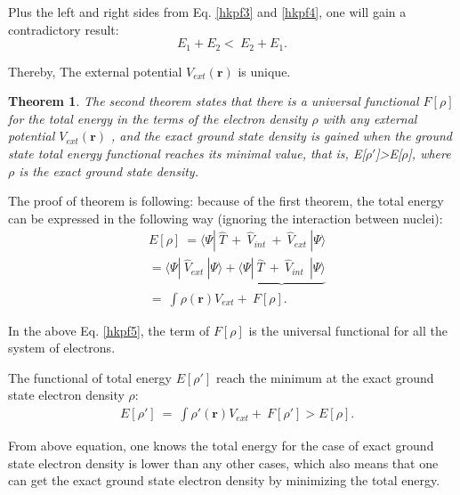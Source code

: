 \documentclass[a4paper, 12pt, titlepage,oneside,drop]{kthesis}
\newtheorem{thm}{Theorem}
\begin{document}
Plus the left and right sides from Eq. \ref{hkpf3} and \ref{hkpf4}, one will gain a contradictory result:
\begin{equation}\label{hkpf4}
  E_1 + E_2  < \  E_2 + E_1.
\end{equation}

Thereby, The external potential $V_\textit{ext}(\textbf{r})$ is unique.

\begin{thm}
\label{hk2}
\noindent The second theorem states that there is a universal functional $F[\rho]$ for the total energy in the terms of the electron density $\rho$ with any external potential $V_\textit{ext}(\textbf{r})$ ,
and the exact ground state density is gained when the ground state total energy functional reaches its minimal value, that is, E[$\rho'$]>E[$\rho$], where $\rho$ is the exact ground state density.
\end{thm}

The proof of theorem is following:
because of the first theorem, the total energy can be expressed in the following way (ignoring the interaction between nuclei):
\begin{equation}\label{hkpf5}\begin{split}
& E[\rho] \ =\langle \Psi  | \ \hat{T} \ + \ \hat{V}_\textit{int}  \ + \ \hat{V}_\textit{ext} \ | \Psi \rangle \\
&     = \langle \Psi  | \ \hat{V}_\textit{ext} \ | \Psi \rangle  + \underbrace{\langle \Psi  | \ \hat{T} \ + \ \hat{V}_\textit{int}  \ \ | \Psi \rangle}  \\
&     =   \ \int \rho(\textbf{r}) V_\textit{ext}  + \                    F[\rho]. 
\end{split}
\end{equation}

In the above Eq. \ref{hkpf5}, the term of $F[\rho]$ is the universal functional for all the system of electrons.

The functional of total energy $E[\rho']$ reach the minimum at the exact ground state electron density $\rho$:
\begin{equation}\begin{split}
 & E[\rho'] \ =   \ \int \rho'(\textbf{r}) V_\textit{ext}  + \  F[\rho'] > E[\rho]. 
\end{split}
\end{equation}
 


From above equation, one knows the total energy for the case of exact ground state electron density is lower than any other cases, which also means that one can get 
the exact ground state electron density by minimizing the total energy.
\end{document}
